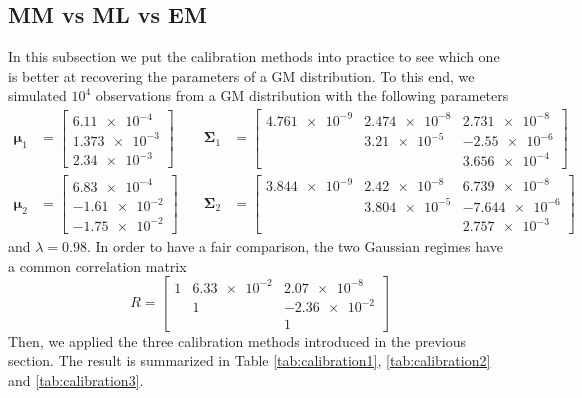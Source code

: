 \subsection{MM vs ML vs EM}
In this subsection we put the calibration methods into practice to see which one is better at recovering the parameters of a GM distribution. To this end, we simulated $10^4$ observations from a GM distribution with the following parameters
\begin{align*}
\bm{\mu}_1 & = 
\begin{bmatrix}
\num{6.11e-4} \\
\num{1.373e-3} \\  
\num{2.34e-3}
\end{bmatrix}
\quad & \bm{\Sigma}_1 &= 
\begin{bmatrix}
\num{4.761e-9} & \num{2.474e-8} & \num{2.731e-8} \\
               & \num{3.21e-5}  & \num{-2.55e-6} \\
               &                & \num{3.656e-4}
\end{bmatrix} \\
\bm{\mu}_2 & = \begin{bmatrix}
\num{6.83e-4} \\
\num{-1.61e-2} \\
\num{-1.75e-2}
\end{bmatrix}
\quad & \bm{\Sigma}_2 &= 
\begin{bmatrix}
\num{3.844e-9} & \num{2.42e-8} & \num{6.739e-8} \\
               & \num{3.804e-5}  & \num{-7.644e-6} \\
               &                & \num{2.757e-3}
\end{bmatrix}
\end{align*}
and $\lambda = 0.98$. In order to have a fair comparison, the two Gaussian regimes have a common correlation matrix \[ R = 
\begin{bmatrix}
\num{1} & \num{6.33e-2} & \num{2.07e-8} \\
        & \num{1}       & \num{-2.36e-2} \\
        &                & \num{1}
\end{bmatrix}\]
Then, we applied the three calibration methods introduced in the previous section. The result is summarized in Table \ref{tab:calibration1}, \ref{tab:calibration2} and \ref{tab:calibration3}.
